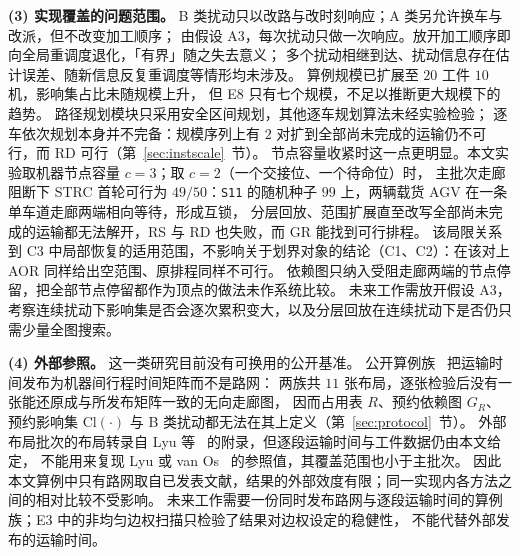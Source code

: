 \documentclass[manuscript,screen,review]{acmart}
\providecommand{\STRC}{\textsc{STRC}}
\newcommand{\NPairs}{50}
\newcommand{\ScaleJobsHi}{20}
\newcommand{\ScaleMachHi}{10}
\begin{document}
\textbf{(3) 实现覆盖的问题范围。}
B 类扰动只以改路与改时刻响应；A 类另允许换车与改派，但不改变加工顺序；
由假设 A3，每次扰动只做一次响应。放开加工顺序即向全局重调度退化，「有界」随之失去意义；
多个扰动相继到达、扰动信息存在估计误差、随新信息反复重调度等情形均未涉及。
算例规模已扩展至 \(\ScaleJobsHi\) 工件 \(\ScaleMachHi\) 机，影响集占比未随规模上升，
但 E8 只有七个规模，不足以推断更大规模下的趋势。
路径规划模块只采用安全区间规划，其他逐车规划算法未经实验检验；
逐车依次规划本身并不完备：规模序列上有 \(2\) 对扩到全部尚未完成的运输仍不可行，而 RD 可行（第~\ref{sec:instscale}~节）。
节点容量收紧时这一点更明显。本文实验取机器节点容量 \(c=3\)；取 \(c=2\)（一个交接位、一个待命位）时，
主批次走廊阻断下 \STRC{} 首轮可行为 \(49/\NPairs\)：\texttt{S11} 的随机种子 \(99\) 上，两辆载货 AGV 在一条单车道走廊两端相向等待，形成互锁，
分层回放、范围扩展直至改写全部尚未完成的运输都无法解开，RS 与 RD 也失败，而 GR 能找到可行排程。
该局限关系到 C3 中局部恢复的适用范围，不影响关于划界对象的结论（C1、C2）：在该对上 AOR 同样给出空范围、原排程同样不可行。
依赖图只纳入受阻走廊两端的节点停留，把全部节点停留都作为顶点的做法未作系统比较。
未来工作需放开假设 A3，考察连续扰动下影响集是否会逐次累积变大，以及分层回放在连续扰动下是否仍只需少量全图搜索。

\textbf{(4) 外部参照。}
这一类研究目前没有可换用的公开基准。
公开算例族~\cite{homayouni2021production,fontes2023hybrid} 把运输时间发布为机器间行程时间矩阵而不是路网：
两族共 \(11\) 张布局，逐张检验后没有一张能还原成与所发布矩阵一致的无向走廊图，
因而占用表 \(R\)、预约依赖图 \(G_R\)、预约影响集 \(\mathrm{Cl}(\cdot)\) 与 B 类扰动都无法在其上定义（第~\ref{sec:protocol}~节）。
外部布局批次的布局转录自 Lyu 等~\cite{lyu2019approach} 的附录，但逐段运输时间与工件数据仍由本文给定，
不能用来复现 Lyu 或 van Os~\cite{vanos2026exact} 的参照值，其覆盖范围也小于主批次。
因此本文算例中只有路网取自已发表文献，结果的外部效度有限；同一实现内各方法之间的相对比较不受影响。
未来工作需要一份同时发布路网与逐段运输时间的算例族；E3 中的非均匀边权扫描只检验了结果对边权设定的稳健性，
不能代替外部发布的运输时间。



\end{document}
